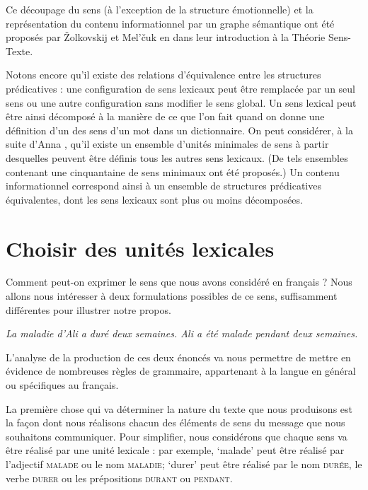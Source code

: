 {    Ce découpage du sens (à l’exception de la structure émotionnelle) et la représentation du contenu informationnel par un graphe sémantique ont été proposés par Žolkovskij et Mel’čuk en \citeyear{zolkovski1967semanticeskom} dans leur introduction à la Théorie Sens-Texte.

    Notons encore qu’il existe des relations d’équivalence entre les structures prédicatives : une configuration de sens lexicaux peut être remplacée par un seul sens ou une autre configuration sans modifier le sens global. Un sens lexical peut être ainsi décomposé à la manière de ce que l’on fait quand on donne une définition d’un des sens d’un mot dans un dictionnaire. On peut considérer, à la suite d’Anna \citet{wierzbivcka1980lingua}, qu’il existe un ensemble d’unités minimales de sens à partir desquelles peuvent être définis tous les autres sens lexicaux. (De tels ensembles contenant une cinquantaine de sens minimaux ont été proposés.) Un contenu informationnel correspond ainsi à un ensemble de structures prédicatives équivalentes, dont les sens lexicaux sont plus ou moins décomposées.
}
\section{Choisir des unités lexicales}\label{sec:1.2.5}

Comment peut-on exprimer le sens que nous avons considéré en français ? Nous allons nous intéresser à deux formulations possibles de ce sens, suffisamment différentes pour illustrer notre propos.

\ea%
    \label{ex:key:1}
          \itshape La maladie d’Ali a duré deux semaines.
\ex%
    \label{ex:key:2}
           \itshape Ali a été malade pendant deux semaines.
\z

L’analyse de la production de ces deux énoncés va nous permettre de mettre en évidence de nombreuses règles de grammaire, appartenant à la langue en général ou spécifiques au français.

La première chose qui va déterminer la nature du texte que nous produisons est la façon dont nous réalisons chacun des éléments de sens du message que nous souhaitons communiquer. Pour simplifier, nous considérons que chaque sens va être réalisé par une unité lexicale : par exemple, ‘malade’ peut être réalisé par l’adjectif \textsc{malade} ou le nom \textsc{maladie}; ‘durer’ peut être réalisé par le nom \textsc{durée}, le verbe \textsc{durer} ou les prépositions \textsc{durant} ou \textsc{pendant}.

